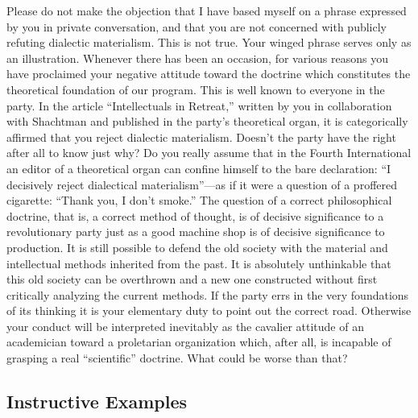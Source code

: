 Please do not make the objection that I have based myself on a phrase expressed by you in private conversation, and that you are not concerned with publicly refuting dialectic materialism. This is not true. Your winged phrase serves only as an illustration. Whenever there has been an occasion, for various reasons you have proclaimed your negative attitude toward the doctrine which constitutes the theoretical foundation of our program. This is well known to everyone in the party. In the article “Intellectuals in Retreat,” written by you in collaboration with Shachtman and published in the party’s theoretical organ, it is categorically affirmed that you reject dialectic materialism. Doesn’t the party have the right after all to know just why? Do you really assume that in the Fourth International an editor of a theoretical organ can confine himself to the bare declaration: “I decisively reject dialectical materialism”---as if it were a question of a proffered cigarette: “Thank you, I don’t smoke.” The question of a correct philosophical doctrine, that is, a correct method of thought, is of decisive significance to a revolutionary party just as a good machine shop is of decisive significance to production. It is still possible to defend the old society with the material and intellectual methods inherited from the past. It is absolutely unthinkable that this old society can be overthrown and a new one constructed without first critically analyzing the current methods. If the party errs in the very foundations of its thinking it is your elementary duty to point out the correct road. Otherwise your conduct will be interpreted inevitably as the cavalier attitude of an academician toward a proletarian organization which, after all, is incapable of grasping a real “scientific” doctrine. What could be worse than that?
\nowidow

\subsection*{Instructive Examples}

